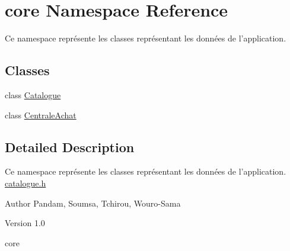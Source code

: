 \hypertarget{namespacecore}{
\section{core Namespace Reference}
\label{d9/d0f/namespacecore}
}


Ce namespace représente les classes représentant les données de l'application.  


\subsection*{Classes}
\begin{DoxyCompactItemize}
\item 
class \hyperlink{classcore_1_1_catalogue}{Catalogue}
\item 
class \hyperlink{classcore_1_1_centrale_achat}{CentraleAchat}
\end{DoxyCompactItemize}


\subsection{Detailed Description}
Ce namespace représente les classes représentant les données de l'application. \hyperlink{catalogue_8h_source}{catalogue.h} \begin{DoxyAuthor}{Author}
Pandam, Soumsa, Tchirou, Wouro-\/Sama 
\end{DoxyAuthor}
\begin{DoxyVersion}{Version}
1.0
\end{DoxyVersion}
core 